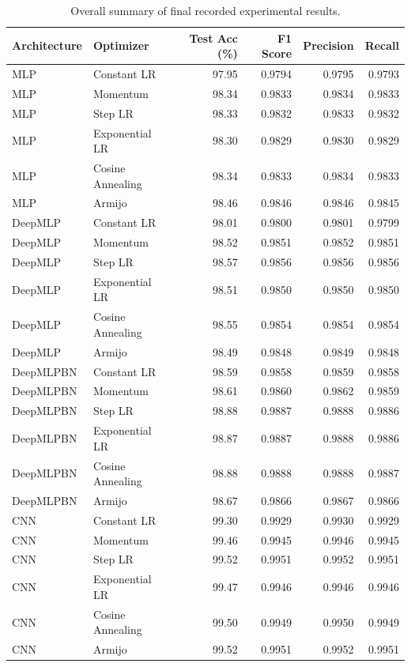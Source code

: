 \begin{table}[ht]
\centering
\caption{Overall summary of final recorded experimental results.}
\label{tab:overall_summary}
\begin{tabular}{llrrrr}
\hline
Architecture & Optimizer & Test Acc (\%) & F1 Score & Precision & Recall \\
\hline
MLP & Constant LR & 97.95 & 0.9794 & 0.9795 & 0.9793 \\
MLP & Momentum & 98.34 & 0.9833 & 0.9834 & 0.9833 \\
MLP & Step LR & 98.33 & 0.9832 & 0.9833 & 0.9832 \\
MLP & Exponential LR & 98.30 & 0.9829 & 0.9830 & 0.9829 \\
MLP & Cosine Annealing & 98.34 & 0.9833 & 0.9834 & 0.9833 \\
MLP & Armijo & 98.46 & 0.9846 & 0.9846 & 0.9845 \\
DeepMLP & Constant LR & 98.01 & 0.9800 & 0.9801 & 0.9799 \\
DeepMLP & Momentum & 98.52 & 0.9851 & 0.9852 & 0.9851 \\
DeepMLP & Step LR & 98.57 & 0.9856 & 0.9856 & 0.9856 \\
DeepMLP & Exponential LR & 98.51 & 0.9850 & 0.9850 & 0.9850 \\
DeepMLP & Cosine Annealing & 98.55 & 0.9854 & 0.9854 & 0.9854 \\
DeepMLP & Armijo & 98.49 & 0.9848 & 0.9849 & 0.9848 \\
DeepMLPBN & Constant LR & 98.59 & 0.9858 & 0.9859 & 0.9858 \\
DeepMLPBN & Momentum & 98.61 & 0.9860 & 0.9862 & 0.9859 \\
DeepMLPBN & Step LR & 98.88 & 0.9887 & 0.9888 & 0.9886 \\
DeepMLPBN & Exponential LR & 98.87 & 0.9887 & 0.9888 & 0.9886 \\
DeepMLPBN & Cosine Annealing & 98.88 & 0.9888 & 0.9888 & 0.9887 \\
DeepMLPBN & Armijo & 98.67 & 0.9866 & 0.9867 & 0.9866 \\
CNN & Constant LR & 99.30 & 0.9929 & 0.9930 & 0.9929 \\
CNN & Momentum & 99.46 & 0.9945 & 0.9946 & 0.9945 \\
CNN & Step LR & 99.52 & 0.9951 & 0.9952 & 0.9951 \\
CNN & Exponential LR & 99.47 & 0.9946 & 0.9946 & 0.9946 \\
CNN & Cosine Annealing & 99.50 & 0.9949 & 0.9950 & 0.9949 \\
CNN & Armijo & 99.52 & 0.9951 & 0.9952 & 0.9951 \\
\hline
\end{tabular}
\end{table}

